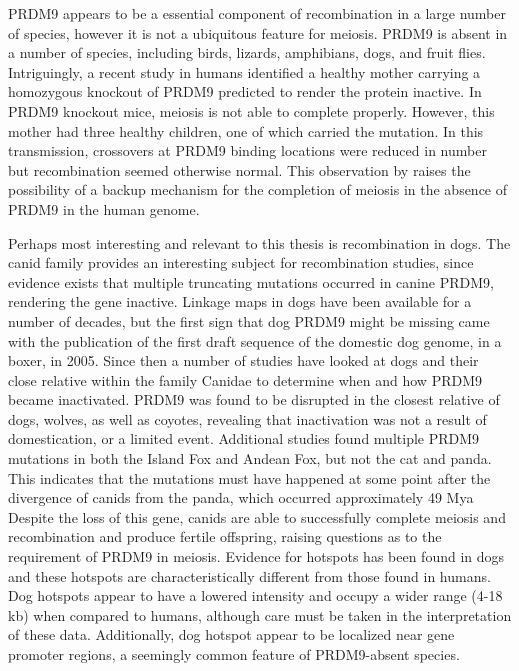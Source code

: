 PRDM9 appears to be a essential component of recombination in a large number of species, however it is not a ubiquitous feature for meiosis.
PRDM9 is absent in a number of species, including birds, lizards, amphibians, dogs, and fruit flies\cite{Ponting2011,Oliver2009}.
Intriguingly, a recent study in humans identified a healthy mother carrying a homozygous knockout of PRDM9 predicted to render the protein inactive\cite{Narasimhan2016}.
In PRDM9 knockout mice, meiosis is not able to complete properly\cite{Brick2012}.
However, this mother had three healthy children, one of which carried the mutation.
In this transmission, crossovers at PRDM9 binding locations were reduced in number but recombination seemed otherwise normal.
This observation by \citet{Narasimhan2016} raises the possibility of a backup mechanism for the completion of meiosis in the absence of PRDM9 in the human genome.


Perhaps most interesting and relevant to this thesis is recombination in dogs. %
The canid family provides an interesting subject for recombination studies, since evidence exists that multiple truncating mutations occurred in canine PRDM9, rendering the gene inactive.
Linkage maps in dogs have been available for a number of decades\cite{Mellersh1997,Neff1999}, but
the first sign that dog PRDM9 might be missing came with the publication of the first draft sequence of the domestic dog genome, in a boxer, in 2005\cite{Lindblad-Toh2005}.
Since then a number of studies have looked at dogs and their close relative within the family Canidae to determine when and how PRDM9 became inactivated.
PRDM9 was found to be disrupted in the closest relative of dogs, wolves, as well as coyotes\cite{Munoz-Fuentes2011}, revealing that inactivation was not a result of domestication, or a limited event.
Additional studies found multiple PRDM9 mutations in both the Island Fox and Andean Fox\cite{Auton2013}, but not the cat and panda\cite{Axelsson2012}.
This indicates that the mutations must have happened at some point after the divergence of canids from the panda, which occurred approximately 49 Mya\cite{Oliver2009,Axelsson2012}
Despite the loss of this gene, canids are able to successfully complete meiosis and recombination and produce fertile offspring, raising questions as to the requirement of PRDM9 in meiosis.
Evidence for hotspots has been found in dogs and these hotspots are characteristically different from those found in humans.
Dog hotspots appear to have a lowered intensity and occupy a wider range (4-18 kb)\cite{Axelsson2012,Auton2013} when compared to humans, although care must be taken in the interpretation of these data.
Additionally, dog hotspot appear to be localized near gene promoter regions\cite{Auton2013}, a seemingly common feature of PRDM9-absent species.

